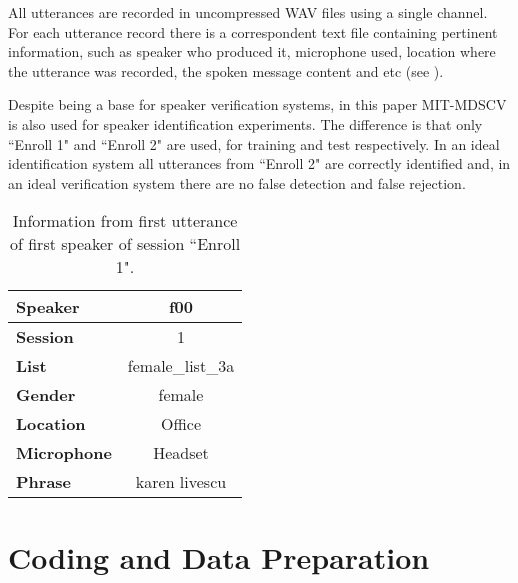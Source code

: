 All utterances are recorded in uncompressed WAV files using a single channel. For each utterance record there is a correspondent text file containing pertinent information, such as speaker who produced it, microphone used, location where the utterance was recorded, the spoken message content and etc (see ).

Despite being a base for speaker verification systems, in this paper MIT-MDSCV is also used for speaker identification experiments. The difference is that only ``Enroll 1" and ``Enroll 2" are used, for training and test respectively. In an ideal identification system all utterances from ``Enroll 2" are correctly identified and, in an ideal verification system there are no false detection and false rejection.

\begin{table}[h]
    \centering
    \begin{tabular}{|l|c|}
    \hline
    {\bf Speaker}    & f00              \\ \hline
    {\bf Session}    & 1                \\ \hline
    {\bf List}       & female\_list\_3a \\ \hline
    {\bf Gender}     & female           \\ \hline
    {\bf Location}   & Office           \\ \hline
    {\bf Microphone} & Headset          \\ \hline
    {\bf Phrase}     & karen livescu    \\ \hline
    \end{tabular}
    \caption{Information from first utterance of first speaker of session ``Enroll 1".}
    \label{tab:utterance-info}
\end{table}

\section{Coding and Data Preparation}
\label{sec:coding-and-data-preparation}